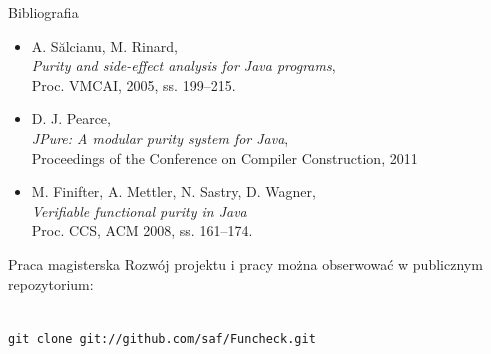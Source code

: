 \documentclass{beamer}
\begin{document}
\begin{frame}{Bibliografia}
  \begin{itemize}
  \item A. S\u{a}lcianu, M. Rinard, \\
    \emph{Purity and side-effect analysis for Java programs}, \\
         Proc. VMCAI, 2005, ss. 199--215.
  \item D. J. Pearce, \\
    \emph{JPure: A modular purity system for Java}, \\
    Proceedings of the Conference on Compiler Construction, 2011
  \item M. Finifter, A. Mettler, N. Sastry, D. Wagner, \\
    \emph{Verifiable functional purity in Java} \\
    Proc. CCS, ACM 2008, ss. 161--174.
  \end{itemize}
\end{frame}

\begin{frame}{Praca magisterska}
  Rozwój projektu i pracy można obserwować w publicznym repozytorium:
  \begin{center}
    \vspace{3mm}
    \\
    \vspace{3mm}
    \texttt{git clone git://github.com/saf/Funcheck.git}
  \end{center}
\end{frame}
\end{document}
